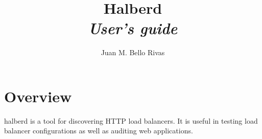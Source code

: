 \documentclass[a4paper]{book}
\begin{document}
\title{Halberd\\{\Large \it User's guide}}
\author{Juan M. Bello Rivas}
\maketitle

\tableofcontents

\chapter{Overview}

halberd is a tool for discovering HTTP load balancers. It is useful in testing
load balancer configurations as well as auditing web applications.
\end{document}

